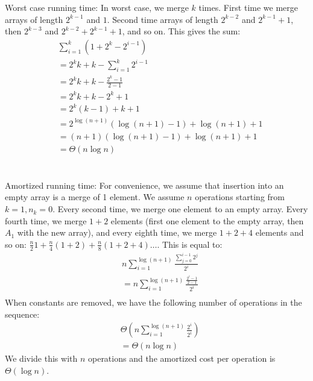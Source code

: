 \documentclass[koma,a4paper]{article}
\begin{document}
Worst case running time: In worst case, we merge $k$ times. First time we merge arrays of length $2^{k-1}$ and $1$. Second time arrays of length $2^{k-2}$ and $2^{k-1}+1$, then $2^{k-3}$ and $2^{k-2}+2^{k-1}+1$, and so on. This gives the sum:
\begin{align*}
&\sum_{i=1}^{k}(1+2^k-2^{i-1})\\
&= 2^kk+k - \sum_{i=1}^{k} 2^{i-1}\\
&=2^kk+k-\frac{2^k-1}{2-1}\\
&=2^kk+k-2^k+1\\
&=2^k(k-1)+k+1\\
&=2^{\log(n+1)}(\log(n+1)-1)+\log(n+1)+1\\
&=(n+1)(\log(n+1)-1)+\log(n+1)+1\\
&=\Theta\left(n\log n\right)
\end{align*}
\\\\
Amortized running time: For convenience, we assume that insertion into an empty array is a merge of 1 element. We assume $n$ operations starting from $k=1, n_k=0$. Every second time, we merge one element to an empty array. Every fourth time, we merge $1+2$ elements (first one element to the empty array, then $A_1$ with the new array), and every eighth time, we merge $1+2+4$ elements and so on: $\frac{n}{2}1+\frac{n}{4}(1+2)+\frac{n}{8}(1+2+4) \ldots$. This is equal to:
\begin{align*}
  &n \sum_{i=1}^{\log(n+1)} \frac{\sum_{j=0}^{i-1}2^j}{2^i}\\
  &=n \sum_{i=1}^{\log(n+1)} \frac{\frac{2^i-1}{2-1}}{2^i}\\
\end{align*}
When constants are removed, we have the following number of operations in the sequence:
\begin{align*}
  &\Theta\left(n \sum_{i=1}^{\log(n+1)} \frac{2^i}{2^i}\right)\\
  &=\Theta\left(n \log n\right)
\end{align*}
We divide this with $n$ operations and the amortized cost per operation is $\Theta\left(\log n\right)$.
\end{document}
